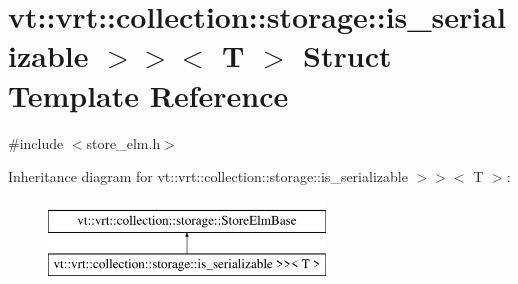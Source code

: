 \hypertarget{structvt_1_1vrt_1_1collection_1_1storage_1_1_store_elm_3_01_t_00_01typename_01std_1_1enable__if_f645d7011e081ebef1092328b0917bfc}{}\section{vt\+:\+:vrt\+:\+:collection\+:\+:storage\+:\+:is\+\_\+serializable $>$$>$$<$ T $>$ Struct Template Reference}
\label{structvt_1_1vrt_1_1collection_1_1storage_1_1_store_elm_3_01_t_00_01typename_01std_1_1enable__if_f645d7011e081ebef1092328b0917bfc}


{\ttfamily \#include $<$store\+\_\+elm.\+h$>$}

Inheritance diagram for vt\+:\+:vrt\+:\+:collection\+:\+:storage\+:\+:is\+\_\+serializable $>$$>$$<$ T $>$\+:\begin{figure}[H]
\begin{center}
\leavevmode
\includegraphics[height=2.000000cm]{structvt_1_1vrt_1_1collection_1_1storage_1_1_store_elm_3_01_t_00_01typename_01std_1_1enable__if_f645d7011e081ebef1092328b0917bfc}
\end{center}
\end{figure}
